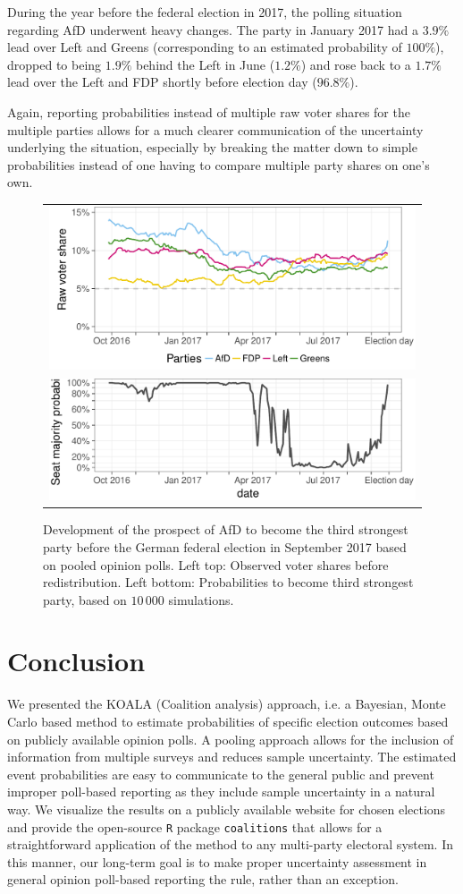 \documentclass[smallcondensed]{svjour3}     %
\begin{document}
During the year before the federal election in 2017, the polling situation
regarding AfD underwent heavy changes. The party in January 2017 had a $3.9\%$ lead
over Left and Greens (corresponding to an estimated probability of $100\%$),
dropped to being $1.9\%$ behind the Left in June ($1.2\%$)
and rose back to a $1.7\%$ lead over the Left and FDP shortly before election
day ($96.8\%$).

Again, reporting probabilities instead of multiple raw voter shares
for the multiple parties allows for a much clearer communication of the
uncertainty underlying the situation, especially by breaking the matter down
to simple probabilities instead of one having to compare multiple party
shares on one's own.

\begin{figure}[H]\centering
\begin{tabular}{l}
\includegraphics[height=.2\textwidth]{figures/2017_pooled_afd_rawShares.pdf}
\\
\includegraphics[height=.15\textwidth]{figures/2017_pooled_afd_thirdPartyProb.pdf}
\end{tabular}
\caption{Development of the prospect of AfD to become the third strongest party before the German federal election in September 2017 based on pooled opinion polls.
Left top: Observed voter shares before redistribution. Left bottom: Probabilities to become third strongest party, based on $10\,000$ simulations.
\label{fig:2017_afd}
}
\end{figure}


\section{Conclusion} \label{sec:conclusion}
We presented the KOALA (Coalition analysis) approach,
i.e. a Bayesian, Monte Carlo based method to estimate probabilities of specific
election outcomes based on publicly available opinion polls.
A pooling approach allows for the inclusion of information from multiple
surveys and reduces sample uncertainty.
The estimated event probabilities are easy to communicate to the general
public and prevent improper poll-based reporting as they include
sample uncertainty in a natural way.
We visualize the results on a publicly available website for chosen elections and
provide the open-source \texttt{R} package \texttt{coalitions} that allows for a
straightforward application of the method to any multi-party electoral system.
In this manner, our long-term goal is to make proper uncertainty assessment
in general opinion poll-based reporting the rule, rather than an exception.
\end{document}

